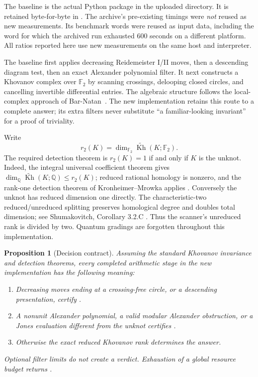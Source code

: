 \documentclass[11pt]{article}
\newtheorem{proposition}{Proposition}[section]
\newcommand{\F}{\mathbb F}
\newcommand{\rKh}{\widetilde{\operatorname{Kh}}}
\newcommand{\code}[1]{\texttt{\detokenize{#1}}}
\begin{document}
The baseline is the actual Python package in the uploaded \code{fast/}
directory. It is retained byte-for-byte in \code{baseline/fastunknot/}.
The archive's pre-existing timings were \emph{not} reused as new measurements.
Its benchmark words were reused as input data, including the word for which
the archived run exhausted 600 seconds on a different platform. All ratios
reported here use new measurements on the same host and interpreter.

The baseline first applies decreasing Reidemeister I/II moves, then a descending
diagram test, then an exact Alexander polynomial filter. It next constructs a
Khovanov complex over $\F_2$ by scanning crossings, delooping closed circles,
and cancelling invertible differential entries. The algebraic structure follows
the local-complex approach of Bar-Natan~\cite{barnatan}. The new implementation
retains this route to a complete answer; its extra filters never substitute
``a familiar-looking invariant'' for a proof of triviality.

Write
\[
 r_2(K)=\dim_{\F_2}\rKh(K;\F_2).
\]
The required detection theorem is $r_2(K)=1$ if and only if $K$ is the unknot.
Indeed, the integral universal coefficient theorem gives
$\dim_{\mathbb Q}\rKh(K;\mathbb Q)\leq r_2(K)$; reduced rational homology is
nonzero, and the rank-one detection theorem of Kronheimer--Mrowka applies
\cite{kronheimer}. Conversely the unknot has reduced dimension one directly.
The characteristic-two reduced/unreduced splitting preserves homological
degree and doubles total dimension; see Shumakovitch, Corollary 3.2.C
\cite{shumakovitch}. Thus the scanner's unreduced rank is divided by two.
Quantum gradings are forgotten throughout this implementation.

\begin{proposition}[Decision contract]
Assuming the standard Khovanov invariance and detection theorems, every completed
arithmetic stage in the new implementation has the following meaning:
\begin{enumerate}
\item Decreasing moves ending at a crossing-free circle, or a descending
  presentation, certify \code{UNKNOT}.
\item A nonunit Alexander polynomial, a valid modular Alexander obstruction,
  or a Jones evaluation different from the unknot certifies \code{KNOTTED}.
\item Otherwise the exact reduced Khovanov rank determines the answer.
\end{enumerate}
Optional filter limits do not create a verdict. Exhaustion of a global
resource budget returns \code{UNKNOWN}.
\end{proposition}
\end{document}
